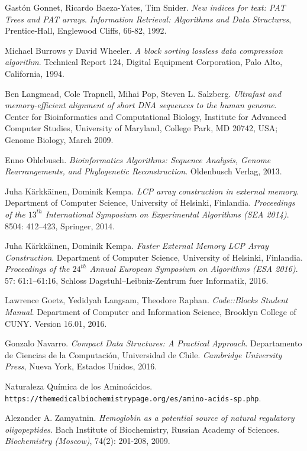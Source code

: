 \documentclass[letterpaper, 10pt, notitlepage]{report}
\newlength{\defbaselineskip}
\newcommand{\singlespacing}{\setlength{\baselineskip}{\defbaselineskip}}
\begin{document}
\begin{thebibliography}{9}
Gastón Gonnet, Ricardo Baeza-Yates, Tim Snider.
\textit{New indices for text: PAT Trees and PAT arrays}.
\textit{Information Retrieval: Algorithms and Data Structures}, Prentice-Hall, Englewood Cliffs, 66-82, 1992.

Michael Burrows y David Wheeler.
\textit{A block sorting lossless data compression algorithm}. 
Technical Report 124, Digital Equipment Corporation, Palo Alto, California, 1994.

Ben Langmead, Cole Trapnell, Mihai Pop, Steven L. Salzberg.
\textit{Ultrafast and memory-efficient alignment of short DNA sequences to the human genome}. 
Center for Bioinformatics and Computational Biology, Institute for Advanced Computer Studies, University of Maryland, College Park, MD 20742, USA; Genome Biology, March 2009.

Enno Ohlebusch.
\textit{Bioinformatics Algorithms: Sequence Analysis, Genome Rearrangements, and Phylogenetic Reconstruction}. 
Oldenbusch Verlag, 2013.

Juha Kärkkäinen, Dominik Kempa.
\textit{LCP array construction in external memory}.
Department of Computer Science, University of Helsinki, Finlandia.
\textit{Proceedings of the $13^{th}$ International Symposium on Experimental Algorithms (SEA 2014)}.
8504: 412–423, Springer, 2014.

Juha Kärkkäinen, Dominik Kempa.
\textit{Faster External Memory LCP Array Construction}.
Department of Computer Science, University of Helsinki, Finlandia.
\textit{Proceedings of the $24^{th}$ Annual European Symposium on Algorithms (ESA 2016)}.
57: 61:1–61:16, Schloss Dagstuhl–Leibniz-Zentrum fuer Informatik, 2016.

Lawrence Goetz, Yedidyah Langsam, Theodore Raphan.
\textit{Code::Blocks Student Manual}.
Department of Computer and Information Science, Brooklyn College of CUNY.
Version 16.01, 2016.

Gonzalo Navarro.
\textit{Compact Data Structures: A Practical Approach}.
Departamento de Ciencias de la Computación, Universidad de Chile.
\textit{Cambridge University Press}, Nueva York, Estados Unidos, 2016.

Naturaleza Química de los Aminoácidos.
\\\texttt{https://themedicalbiochemistrypage.org/es/amino-acids-sp.php}.

Alezander A. Zamyatnin.
\textit{Hemoglobin as a potential source of natural regulatory oligopeptides}.
Bach Institute of Biochemistry, Russian Academy of Sciences.
\textit{Biochemistry (Moscow)}, 74(2): 201-208, 2009.



\end{thebibliography}

%




\singlespacing
\cleardoublepage
\end{document}

